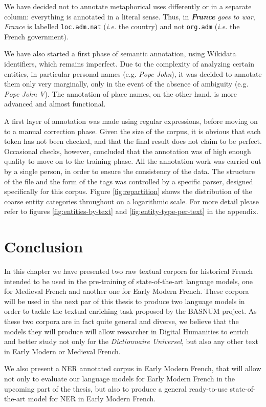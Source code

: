 We have decided not to annotate metaphorical uses differently or in a separate column: everything is annotated in a literal sense. Thus, in \textit{\textbf{France} goes to war}, \textit{France} is labelled \texttt{loc.adm.nat} (\textit{i.e.} the country) and not \texttt{org.adm} (\textit{i.e.} the French government).

We have also started a first phase of semantic annotation, using Wikidata~\citep{vrandecic-krotzsch-2014-wikidata} identifiers, which remains imperfect. Due to the complexity of analyzing certain entities, in particular personal names (e.g. \textit{Pope John}), it was decided to annotate them only very marginally, only in the event of the absence of ambiguity (e.g. \textit{Pope John V}). The annotation of place names, on the other hand, is more advanced and almost functional.

A first layer of annotation was made using regular expressions, before moving on to a manual correction phase. Given the size of the corpus, it is obvious that each token has not been checked, and that the final result does not claim to be perfect. Occasional checks, however, concluded that the annotation was of high enough quality to move on to the training phase. All the annotation work was carried out by a single person, in order to ensure the consistency of the data. The structure of the file and the form of the tags was controlled by a specific parser, designed specifically for this corpus. Figure \ref{fig:repartition} shows the distribution of the coarse entity categories throughout \freemner on a logarithmic scale. For more detail please refer to figures \ref{fig:entities-by-text} and \ref{fig:entity-type-per-text} in the appendix.

\section{Conclusion}

In this chapter we have presented two raw textual corpora for historical French intended to be used in the pre-training of state-of-the-art language models, one for Medieval French and another one for Early Modern French. These corpora will be used in the next par of this thesis to produce two language models in order to tackle the textual enriching task proposed by the BASNUM project. As these two corpora are in fact quite general and diverse, we believe that the models they will produce will allow researcher in Digital Humanities to enrich and better study not only for the \emph{Dictionnaire Universel}, but also any other text in Early Modern or Medieval French.

We also present a NER annotated corpus in Early Modern French, that will allow not only to evaluate our language models for Early Modern French in the upcoming part of the thesis, but also to produce a general ready-to-use state-of-the-art model for NER in Early Modern French.
